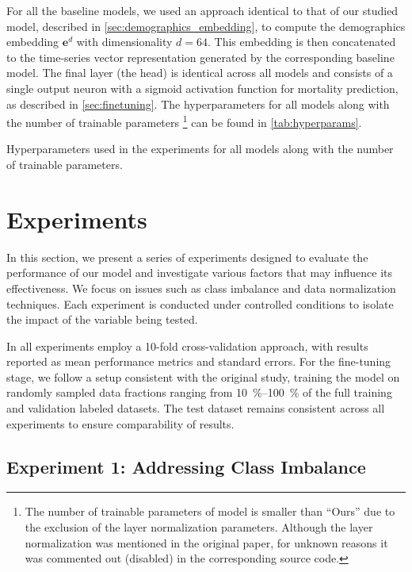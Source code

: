 For all the baseline models, we used an approach identical to that of our studied model, described in \cref{sec:demographics_embedding}, to compute the demographics embedding \( \mathbf{e}^d \) with dimensionality \( d = 64 \). This embedding is then concatenated to the time-series vector representation generated by the corresponding baseline model. The final layer (the head) is identical across all models and consists of a single output neuron with a sigmoid activation function for mortality prediction, as described in \cref{sec:finetuning}. The hyperparameters for all models along with the number of trainable parameters \footnote{The number of trainable parameters of  model is smaller than ``Ours'' due to the exclusion of the layer normalization parameters. Although the layer normalization was mentioned in the original paper, for unknown reasons it was commented out (disabled) in the corresponding source code.} can be found in \cref{tab:hyperparams}.



\begin{table}
\centering
\caption{Hyperparameters used in the experiments for all models along with the number of trainable parameters.}

\label{tab:hyperparams}
\end{table}

\section{Experiments}
\label{sec:experiments}

In this section, we present a series of experiments designed to evaluate the performance of our model and investigate various factors that may influence its effectiveness. We focus on issues such as class imbalance and data normalization techniques. Each experiment is conducted under controlled conditions to isolate the impact of the variable being tested.

In all experiments employ a 10-fold cross-validation approach, with results reported as mean performance metrics and standard errors. For the fine-tuning stage, we follow a setup consistent with the original study, training the model on randomly sampled data fractions ranging from \qtyrange{10}{100}{\percent} of the full training and validation labeled datasets. The test dataset remains consistent across all experiments to ensure comparability of results.



\subsection{Experiment 1: Addressing Class Imbalance}

